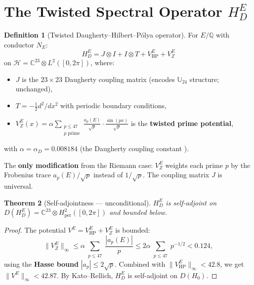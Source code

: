 \documentclass[11pt,a4paper]{article}
\theoremstyle{plain}
\newtheorem{theorem}{Theorem}[section]
\theoremstyle{definition}
\newtheorem{definition}[theorem]{Definition}
\theoremstyle{remark}
\begin{document}
\section{The Twisted Spectral Operator $H_D^E$}

\begin{definition}[Twisted Daugherty--Hilbert--P\'olya operator]\label{def:HDE}
For $E/\mathbb{Q}$ with conductor $N_E$:
\begin{equation}
\boxed{H_D^E = J \otimes I + I \otimes T + V_{\text{HP}}^E + V_Z^E}
\end{equation}
on $\mathcal{H} = \mathbb{C}^{23} \otimes L^2([0,2\pi])$, where:
\begin{itemize}[nosep]
\item $J$ is the $23 \times 23$ Daugherty coupling matrix (encodes $\mathbb{U}_{24}$ structure; unchanged),
\item $T = -\frac{1}{2}d^2/dx^2$ with periodic boundary conditions,
\item $V_Z^E(x) = \alpha \sum_{\substack{p \leq 47 \\ p \text{ prime}}} \frac{a_p(E)}{\sqrt{p}} \cdot \frac{\sin(px)}{\sqrt{p}}$ is the \textbf{twisted prime potential},
\end{itemize}
with $\alpha = \alpha_D = 0.008184$ (the Daugherty coupling constant \cite{DWR2026}).
\end{definition}

The \textbf{only modification} from the Riemann case: $V_Z^E$ weights each prime $p$ by the Frobenius trace $a_p(E)/\sqrt{p}$ instead of $1/\sqrt{p}$. The coupling matrix $J$ is universal.

\begin{theorem}[Self-adjointness --- unconditional]\label{thm:sa}
$H_D^E$ is self-adjoint on $D(H_D^E) = \mathbb{C}^{23} \otimes H_{\text{per}}^2([0,2\pi])$ and bounded below.
\end{theorem}

\begin{proof}
The potential $V^E = V_{\text{HP}}^E + V_Z^E$ is bounded:
\[
\|V_Z^E\|_\infty \leq \alpha \sum_{\substack{p \leq 47}} \frac{|a_p(E)|}{p} \leq 2\alpha \sum_{\substack{p \leq 47}} p^{-1/2} < 0.124,
\]
using the \textbf{Hasse bound} $|a_p| \leq 2\sqrt{p}$. Combined with $\|V_{\text{HP}}^E\|_\infty < 42.8$, we get $\|V^E\|_\infty < 42.87$. By Kato--Rellich, $H_D^E$ is self-adjoint on $D(H_0)$.
\end{proof}
\end{document}
